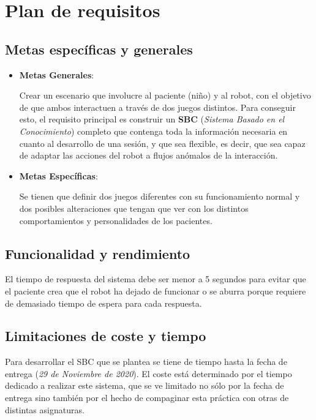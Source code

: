 \documentclass{uc3mpracticas}
\begin{document}
  
  \mainmatter

  \section{Plan de requisitos}
  \subsection{Metas específicas y generales}

  \begin{itemize}
    \item \textbf{Metas Generales}:

    Crear un escenario que involucre al paciente (niño) y al robot, con el objetivo de que ambos interactuen a través de dos juegos distintos. Para conseguir esto, el requisito principal es construir un \textbf{SBC} (\textit{Sistema Basado en el Conocimiento}) completo que contenga toda la información necesaria en cuanto al desarrollo de una sesión, y que sea flexible, es decir, que sea capaz de adaptar las acciones del robot a flujos anómalos de la interacción.

    \item \textbf{Metas Específicas}:

    Se tienen que definir dos juegos diferentes con su funcionamiento normal y dos posibles alteraciones que tengan que ver con los distintos comportamientos y personalidades de los pacientes.
  \end{itemize}

  \subsection{Funcionalidad y rendimiento}

  El tiempo de respuesta del sistema debe ser menor a 5 segundos para evitar que el paciente crea que el robot ha dejado de funcionar o se aburra porque requiere de demasiado tiempo de espera para cada respuesta.

  \subsection{Limitaciones de coste y tiempo}

  Para desarrollar el SBC que se plantea se tiene de tiempo hasta la fecha de entrega (\textit{29 de Noviembre de 2020}). El coste está determinado por el tiempo dedicado a realizar este sistema, que se ve limitado no sólo por la fecha de entrega sino también por el hecho de compaginar esta práctica con otras de distintas asignaturas.
\end{document}

